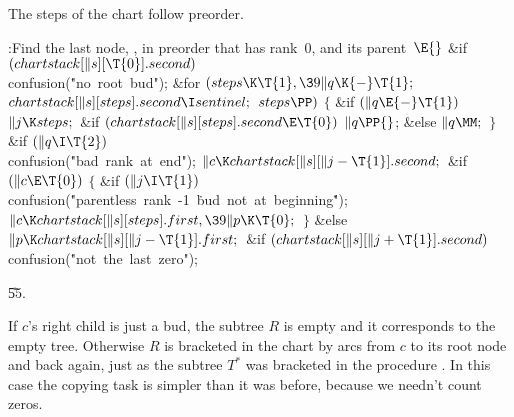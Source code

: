 The steps of the chart follow preorder.

\Y\B\4:Find the last node, , in preorder that has rank~0, and its
parent~\X${}\E{}$\6
\&{if} ${}(\\{chartstack}[\|s][\T{0}].\\{second}){}$\1\5
\\{confusion}(\.{"no\ root\ bud"});\2\6
\&{for} ${}(\\{steps}\K\T{1},\39\|q\K{-}\T{1};{}$ ${}\\{chartstack}[\|s][%
\\{steps}].\\{second}\I\\{sentinel};{}$ ${}\\{steps}\PP){}$\5
${}\{{}$\1\6
\&{if} ${}(\|q\E{-}\T{1}){}$\1\5
${}\|j\K\\{steps};{}$\2\6
\&{if} ${}(\\{chartstack}[\|s][\\{steps}].\\{second}\E\T{0}){}$\1\5
${}\|q\PP{}$;\5
\2\&{else}\1\5
${}\|q\MM;{}$\2\6
\4${}\}{}$\2\6
\&{if} ${}(\|q\I\T{2}){}$\1\5
\\{confusion}(\.{"bad\ rank\ at\ end"});\2\6
${}\|c\K\\{chartstack}[\|s][\|j-\T{1}].\\{second};{}$\6
\&{if} ${}(\|c\E\T{0}){}$\5
${}\{{}$\1\6
\&{if} ${}(\|j\I\T{1}){}$\1\5
\\{confusion}(\.{"parentless\ rank\ -1\ }\)\.{bud\ not\ at\ beginning}\)\.{"});%
\2\6
${}\|c\K\\{chartstack}[\|s][\\{steps}].\\{first},\39\|p\K\T{0};{}$\6
\4${}\}{}$\5
\2\&{else}\1\5
${}\|p\K\\{chartstack}[\|s][\|j-\T{1}].\\{first};{}$\2\6
\&{if} ${}(\\{chartstack}[\|s][\|j+\T{1}].\\{second}){}$\1\5
\\{confusion}(\.{"not\ the\ last\ zero"});\2\par
\U55.\fi

If $c$'s right child is just a bud, the subtree $R$ is empty and
it corresponds to the empty tree. Otherwise $R$ is bracketed in
the chart by arcs from $c$ to its root node and back again,
just as the subtree $T^*$ was bracketed in the procedure .
In this case the copying task is simpler than it was before, because
we needn't count zeros.

